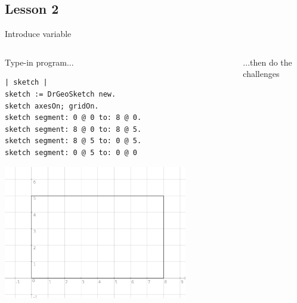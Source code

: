 \documentclass{beamer}
\begin{document}
\subsection{Lesson 2}
\begin{frame}[fragile]{Introduce variable\cite{lesson2}}
\begin{columns}[t]
  \begin{column}{0.5\textwidth}
    Type-in program...    
    \vspace*{10pt}
    \fontsize{9pt}{8pt}\selectfont
      \begin{lstlisting}[language=Smalltalk]
| sketch |
sketch := DrGeoSketch new.
sketch axesOn; gridOn.
sketch segment: 0 @ 0 to: 8 @ 0.
sketch segment: 8 @ 0 to: 8 @ 5.
sketch segment: 8 @ 5 to: 0 @ 5.
sketch segment: 0 @ 5 to: 0 @ 0
\end{lstlisting}
      \includegraphics[width=0.8\textwidth]{lesson2.png}
\end{column}
\begin{column}{0.6\textwidth}
  ...then do the challenges 

\end{column}
\end{columns}
\end{frame}
\end{document}
